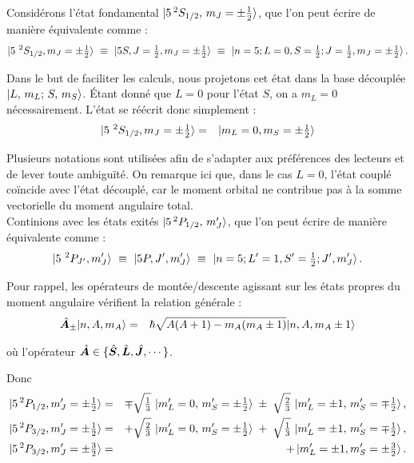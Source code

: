 Considérons l’état fondamental $\ket{5\,^2S_{1/2},\,m_J = \pm \tfrac12}$, que l’on peut écrire de manière équivalente comme :
\begin{eqnarray*}
	\ket{ 5{~}^2S_{1/2} , m_J = \pm \tfrac12  } ~\equiv~ \ket{ 5S , J=\tfrac12  , m_J= \pm \tfrac12  }  ~\equiv~ \ket{n=5 ; L=0 , S=\tfrac12 ;  J=\tfrac12  , m_J = \pm \tfrac12 }.
\end{eqnarray*}

Dans le but de faciliter les calculs, nous projetons cet état dans la base découplée $\ket{L,\,m_L;\,S,\,m_S}$. Étant donné que $L = 0$ pour l’état $S$, on a $m_L = 0$ nécessairement. L’état se réécrit donc simplement :
\begin{eqnarray*}
	\ket{ 5{~}^2S_{1/2} , m_J = \pm \tfrac12  } & = & \ket{  m_L = 0  , m_S= \pm \tfrac12  }  	
\end{eqnarray*}


Plusieurs notations sont utilisées afin de s’adapter aux préférences des lecteurs et de lever toute ambiguïté.
On remarque ici que, dans le cas $L = 0$, l’état couplé coïncide avec l’état découplé, car le moment orbital ne contribue pas à la somme vectorielle du moment angulaire total.\\

Continions avec les états exités $\ket{5\,^2P_{1/2},\,m_J'}$, que l’on peut écrire de manière équivalente comme :
\begin{eqnarray*}
	\ket{ 5{~}^2P_{J'} , m_J'  } ~\equiv~ \ket{ 5P , J'  , m_J' }  ~\equiv~ \ket{n=5 ; L'=1 , S'=\tfrac12 ;  J'  , m_J'  }.
\end{eqnarray*}

Pour rappel, les opérateurs de montée/descente agissant sur les états propres du moment angulaire vérifient la relation générale :
\begin{eqnarray}
	\hat{\bm{A}}_\pm \vert n , A , m	_A \rangle & = & \hbar \sqrt{A(A+1) - m_A(m_A\pm 1 ) } \vert n , A , m	_A \pm 1  \rangle
\end{eqnarray}

où l'opérateur $\hat{\bm{A}} \in \{ \hat{\bm{S}} , \hat{\bm{L}} , \hat{\bm{J}} , \cdots \}$.

Donc 
\begin{eqnarray*} 
	\ket{5\,^2P_{1/2},m_J' = \pm\tfrac12} &=& \mp\sqrt{\tfrac{1}{3}}\,\ket{ m_L'=0,\,m_S'=\pm\tfrac12} \;\pm\;\sqrt{\tfrac{2}{3}}\,\ket{m_L'=\pm 1,\,m_S'=\mp\tfrac12},\\ 
	\ket{5\,^2P_{3/2},m_J' = \pm\tfrac12} &=& +\sqrt{\tfrac{2}{3}}\,\ket{m_L'=0,\,m_S'=\pm\tfrac12} \;+\;\sqrt{\tfrac{1}{3}}\,\ket{ m_L'=\pm 1,\,m_S'=\mp\tfrac12},\\
	\ket{5\,^2P_{3/2},m_J' = \pm\tfrac32} &= & +\ket{m_L'=\pm 1 , m_S' = \pm \tfrac32}.  
\end{eqnarray*}
 
